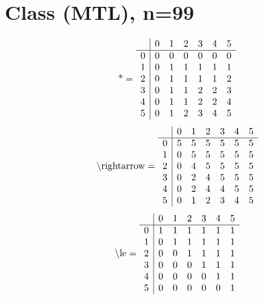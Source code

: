 \documentclass[11pt]{article}
\begin{document}
\section{Class (MTL), n=99}
\[\text{*} = 
\begin{array}{r | r r r r r r}
 & 0 & 1 & 2 & 3 & 4 & 5 \\ \hline
0 & 0 & 0 & 0 & 0 & 0 & 0 \\
1 & 0 & 1 & 1 & 1 & 1 & 1 \\
2 & 0 & 1 & 1 & 1 & 1 & 2 \\
3 & 0 & 1 & 1 & 2 & 2 & 3 \\
4 & 0 & 1 & 1 & 2 & 2 & 4 \\
5 & 0 & 1 & 2 & 3 & 4 & 5 \\
\end{array}
\]
\[\text{\textbackslash rightarrow} = 
\begin{array}{r | r r r r r r}
 & 0 & 1 & 2 & 3 & 4 & 5 \\ \hline
0 & 5 & 5 & 5 & 5 & 5 & 5 \\
1 & 0 & 5 & 5 & 5 & 5 & 5 \\
2 & 0 & 4 & 5 & 5 & 5 & 5 \\
3 & 0 & 2 & 4 & 5 & 5 & 5 \\
4 & 0 & 2 & 4 & 4 & 5 & 5 \\
5 & 0 & 1 & 2 & 3 & 4 & 5 \\
\end{array}
\]
\[\text{\textbackslash le} = 
\begin{array}{r | r r r r r r}
 & 0 & 1 & 2 & 3 & 4 & 5 \\ \hline
0 & 1 & 1 & 1 & 1 & 1 & 1 \\
1 & 0 & 1 & 1 & 1 & 1 & 1 \\
2 & 0 & 0 & 1 & 1 & 1 & 1 \\
3 & 0 & 0 & 0 & 1 & 1 & 1 \\
4 & 0 & 0 & 0 & 0 & 1 & 1 \\
5 & 0 & 0 & 0 & 0 & 0 & 1 \\
\end{array}
\]
\end{document}
